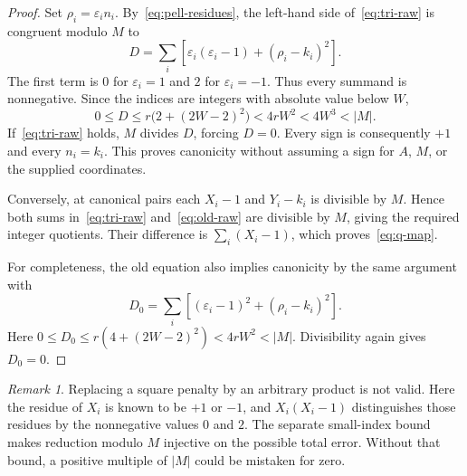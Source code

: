 \documentclass[11pt,letterpaper]{article}
\theoremstyle{definition}\newtheorem{definition}[theorem]{Definition}
\theoremstyle{remark}\newtheorem{remark}[theorem]{Remark}
\begin{document}
\begin{proof}
Set $\rho_i=\varepsilon_i n_i$. By~\eqref{eq:pell-residues}, the left-hand side of~\eqref{eq:tri-raw} is congruent modulo $M$ to
\begin{equation}\label{eq:small-error}
D=\sum_i\left[\varepsilon_i(\varepsilon_i-1)+(\rho_i-k_i)^2\right].
\end{equation}
The first term is $0$ for $\varepsilon_i=1$ and $2$ for $\varepsilon_i=-1$. Thus every summand is nonnegative. Since the indices are integers with absolute value below $W$,
\[
0\le D\le r\bigl(2+(2W-2)^2\bigr)<4rW^2<4W^3<|M|.
\]
If~\eqref{eq:tri-raw} holds, $M$ divides $D$, forcing $D=0$. Every sign is consequently $+1$ and every $n_i=k_i$. This proves canonicity without assuming a sign for $A$, $M$, or the supplied coordinates.

Conversely, at canonical pairs each $X_i-1$ and $Y_i-k_i$ is divisible by $M$. Hence both sums in~\eqref{eq:tri-raw} and~\eqref{eq:old-raw} are divisible by $M$, giving the required integer quotients. Their difference is $\sum_i(X_i-1)$, which proves~\eqref{eq:q-map}.

For completeness, the old equation also implies canonicity by the same argument with
\[
D_0=\sum_i\left[(\varepsilon_i-1)^2+(\rho_i-k_i)^2\right].
\]
Here $0\le D_0\le r(4+(2W-2)^2)<4rW^2<|M|$. Divisibility again gives $D_0=0$.
\end{proof}

\begin{remark}
Replacing a square penalty by an arbitrary product is not valid. Here the residue of $X_i$ is known to be $+1$ or $-1$, and $X_i(X_i-1)$ distinguishes those residues by the nonnegative values $0$ and $2$. The separate small-index bound makes reduction modulo $M$ injective on the possible total error. Without that bound, a positive multiple of $|M|$ could be mistaken for zero.
\end{remark}
\end{document}
